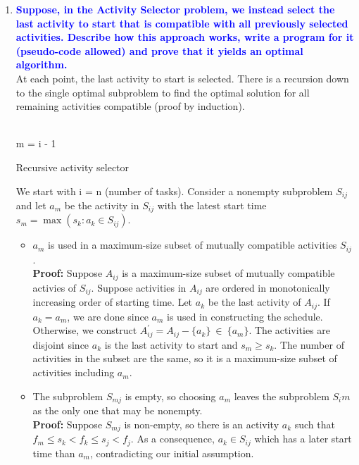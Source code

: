 \documentclass[11pt]{article}
\begin{document}
\begin{enumerate}
\item  \textbf{\textcolor{blue}{Suppose, in the Activity Selector problem, we
instead select the last activity to start that is compatible with all previously
selected activities. Describe how this approach works, write a program for it 
(pseudo-code allowed) and prove that it yields an optimal algorithm.}}
    \\ At each point, the last activity to start is selected. There is a recursion down to the single optimal subproblem to find the optimal solution for all remaining activities compatible (proof by induction). \\
    \begin{algorithm}[H]
        \Indm{}\\
        \Indp
            m = i - 1 \\
        \caption{Recursive activity selector}
    \end{algorithm}
    We start with i = n (number of tasks). Consider a nonempty subproblem $S_{ij}$ and let $a_m$ be the activity in $S_{ij}$ with the latest start time $s_m = \max(s_k : a_k \in S_{ij})$.
    \begin{itemize}
        \item $a_m$ is used in a maximum-size subset of mutually compatible activities $S_{ij}$.
        \\ \textbf{Proof: } Suppose $A_{ij}$ is a maximum-size subset of mutually compatible activies of $S_{ij}$. Suppose activities in $A_{ij}$ are ordered in monotonically increasing order of starting time. Let $a_k$ be the last activity of $A_{ij}$. If $a_k = a_m$, we are done since $a_m$ is used in constructing the schedule. Otherwise, we construct $A^{'}_{ij} = A_{ij} - \{a_k\}\ \in \ \{a_m\}$. The activities are disjoint since $a_k$ is the last activity to start and $s_m \geq s_k$. The number of activities in the subset are the same, so it is a maximum-size subset of activities including $a_m$.
        \item The subproblem $S_{mj}$ is empty, so choosing $a_m$ leaves the subproblem $S_im$ as the only one that may be nonempty.
        \\ \textbf{Proof: } Suppose $S_{mj}$ is non-empty, so there is an activity $a_k$ such that $f_m \leq s_k < f_k \leq s_j < f_j$. As a consequence, $a_k \in S_{ij}$ which has a later start time than $a_m$, contradicting our initial assumption.

\end{itemize}
\end{enumerate}
\end{document}
